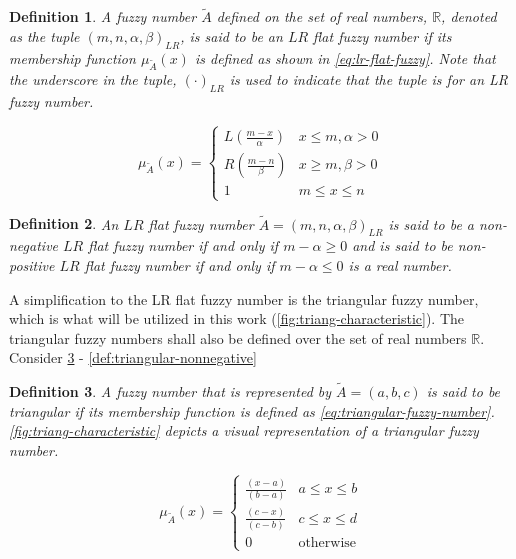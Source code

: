 \documentclass[ee,thesis]{usuthesis}
\newtheorem{definition}{Definition}[section]
\begin{document}
\begin{definition}
\label{def:lr-flat} A fuzzy number \(\tilde{A}\) defined on the set of real numbers, \(\mathbb{R}\), denoted as the tuple
\((m,n,\alpha,\beta)_{LR}\), is said to be an \(LR\) flat fuzzy number if its membership function \(\mu_{\tilde{A}}(x)\) is defined as
shown in \ref{eq:lr-flat-fuzzy}. Note that the underscore in the tuple, \((\cdot)_{LR}\) is used to indicate that the tuple is for
an LR fuzzy number.

\begin{equation}
\label{eq:lr-flat-fuzzy}
\mu_{\tilde{A}}(x) =
\begin{cases}
L(\frac{m-x}{\alpha}) & x \le m, \alpha > 0 \\
R(\frac{m-n}{\beta}) & x \ge m, \beta > 0 \\
1                & m \le x \le n
\end{cases}
\end{equation}
\end{definition}

\begin{definition}
\label{def:lr-non-negative}
An \(LR\) flat fuzzy number \(\tilde{A} = (m,n,\alpha,\beta)_{LR}\) is said to be a non-negative \(LR\) flat fuzzy number if and only
if \(m-\alpha \ge 0\) and is said to be non-positive \(LR\) flat fuzzy number if and only if \(m - \alpha \le 0\) is a real number.
\end{definition}

A simplification to the LR flat fuzzy number is the triangular fuzzy number, which is what will be utilized in this work
(\ref{fig:triang-characteristic}). The triangular fuzzy numbers shall also be defined over the set of real numbers \(\mathbb{R}\). Consider
\ref{def:triangular-fuzzy-number} - \ref{def:triangular-nonnegative}

\begin{definition}
\label{def:triangular-fuzzy-number} A fuzzy number that is represented by \(\tilde{A} = (a,b,c)\) is said to be triangular
if its membership function is defined as \ref{eq:triangular-fuzzy-number}. \ref{fig:triang-characteristic} depicts a visual
representation of a triangular fuzzy number.

\begin{equation}
\label{eq:triangular-fuzzy-number}
  \mu_{\tilde{A}}(x) =
  \begin{cases}
    \frac{(x-a)}{(b-a)} & a \le x \le b \\
    \frac{(c-x)}{(c-b)} & c \le x \le d \\
    0                   & \text{otherwise}
  \end{cases}
\end{equation}
\end{definition}
\end{document}
